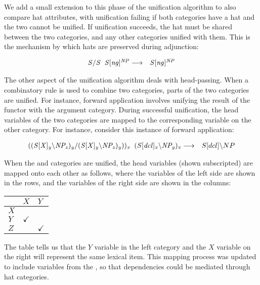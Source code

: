 We add a small extension to this phase of the unification algorithm to also
compare hat attributes, with unification failing if both categories have a hat
and the two cannot be unified. If unification succeeds, the hat must be shared
between the two categories, and any other categories unified with them. This is
the mechanism by which hats are preserved during adjunction:

\begin{eqnarray}
\mbox{$\it{S/S}$}\;\;\mbox{$\it{S[ng]^{NP}}$} & \longrightarrow & \mbox{$\it{S[ng]^{NP}}$}
\end{eqnarray}

The other aspect of the unification algorithm deals with head-passing. When a
combinatory rule is used to combine two categories, parts of the two categories
are unified. For instance, forward application involves unifying the result of
the functor with the argument category. During successful unification, the head
variables of the two categories are mapped to the corresponding variable on the
other category. For instance, consider this instance of forward
application:

\begin{eqnarray}
 \mbox{$\it{((S[X]_y\backslash NP_z)_y/(S[X]_y\backslash NP_z)_y))_x}$}\;\;\mbox{$\it{(S[dcl]_x\backslash NP_y)_x}$} & \longrightarrow & S[dcl]\backslash NP
\end{eqnarray}


When the  and  categories are unified, the head
variables (shown subscripted) are mapped onto each other as follows, where the
variables of the left side are shown in the rows, and the variables of the right
side are shown in the columns:

\begin{center}
\large
\begin{tabular}{l|ll}
  & $X$ & $Y$ \\
\hline
$X$ &   &   \\
$Y$ & $\checkmark$ &   \\
$Z$ &   & $\checkmark$ \\ 
\end{tabular}
\end{center}

The table tells us that the $Y$ variable in the left category and the $X$
variable on the right will represent the same lexical item. This mapping process
was updated to include variables from the , so that dependencies
could be mediated through hat categories.



